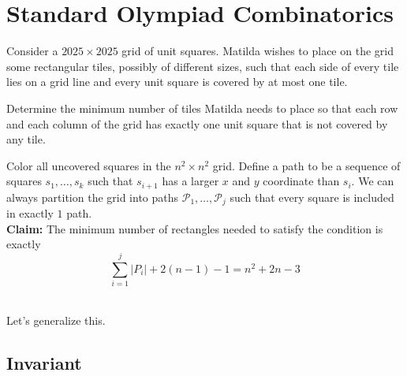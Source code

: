 \documentclass[11pt]{scrartcl}
\theoremstyle{plain} %
\theoremstyle{definition}
\theoremstyle{remark}
\newtheorem{remark}{Remark}
\theoremstyle{empty}
\theoremstyle{empty}
\theoremstyle{empty}
\theoremstyle{empty}
\theoremstyle{empty}
\theoremstyle{empty}
\theoremstyle{empty}
\theoremstyle{empty}
\begin{document}
\begin{problem}
  
\end{problem}





\section{Standard Olympiad Combinatorics}

\begin{problem}[2025 IMO 6]
  Consider a $2025\times2025$ grid of unit squares. Matilda wishes to place on the grid some rectangular tiles, possibly of different sizes, such that each side of every tile lies on a grid line and every unit square is covered by at most one tile.

Determine the minimum number of tiles Matilda needs to place so that each row and each column of the grid has exactly one unit square that is not covered by any tile.
\end{problem}

\begin{solution}
Color all uncovered squares in the $n^2 \times n^2$ grid. Define a path to be a sequence of squares $s_1, \ldots, s_k$ such that $s_{i+1}$ has a larger $x$ and $y$ coordinate than $s_i$. We can always partition the grid into paths $\mathcal P_1, \ldots, \mathcal P_j$ such that every square is included in exactly $1$ path. 
\\
\textbf{Claim: }The minimum number of rectangles needed to satisfy the condition is exactly \[\sum_{i=1}^j |P_i| + 2(n-1) - 1 = n^2+2n-3\]
\\

\end{solution}

Let's generalize this.

\begin{problem}[Buffed to 3D]
  
\end{problem}

\subsection{Invariant}
\end{document}
